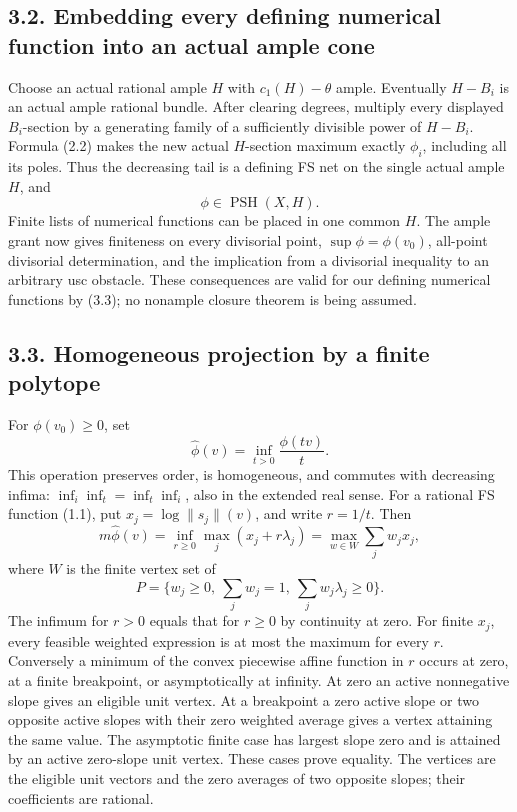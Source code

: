 \documentclass[
  10pt,
]{article}
\begin{document}
\subsection{3.2. Embedding every defining numerical function into an
actual ample
cone}\label{embedding-every-defining-numerical-function-into-an-actual-ample-cone}

Choose an actual rational ample \(H\) with \(c_1(H)-\theta\) ample.
Eventually \(H-B_i\) is an actual ample rational bundle. After clearing
degrees, multiply every displayed \(B_i\)-section by a generating family
of a sufficiently divisible power of \(H-B_i\). Formula (2.2) makes the
new actual \(H\)-section maximum exactly \(\phi_i\), including all its
poles. Thus the decreasing tail is a defining FS net on the single
actual ample \(H\), and \[\phi\in\operatorname{PSH}(X,H).\tag{3.3}\]
Finite lists of numerical functions can be placed in one common \(H\).
The ample grant now gives finiteness on every divisorial point,
\(\sup\phi=\phi(v_0)\), all-point divisorial determination, and the
implication from a divisorial inequality to an arbitrary usc obstacle.
These consequences are valid for our defining numerical functions by
(3.3); no nonample closure theorem is being assumed.

\subsection{3.3. Homogeneous projection by a finite
polytope}\label{homogeneous-projection-by-a-finite-polytope}

For \(\phi(v_0)\geq0\), set
\[\widehat\phi(v)=\inf_{t>0}\frac{\phi(tv)}t.\tag{3.4}\] This operation
preserves order, is homogeneous, and commutes with decreasing infima:
\(\inf_i\inf_t=\inf_t\inf_i\), also in the extended real sense. For a
rational FS function (1.1), put \(x_j=\log\|s_j\|(v)\), and write
\(r=1/t\). Then \[m\widehat\phi(v)=\inf_{r\geq0}\max_j(x_j+r\lambda_j)
=\max_{w\in W}\sum_jw_jx_j,\tag{3.5}\] where \(W\) is the finite vertex
set of
\[P=\{w_j\geq0,\ \sum_jw_j=1,\ \sum_jw_j\lambda_j\geq0\}.\tag{3.6}\] The
infimum for \(r>0\) equals that for \(r\geq0\) by continuity at zero.
For finite \(x_j\), every feasible weighted expression is at most the
maximum for every \(r\). Conversely a minimum of the convex piecewise
affine function in \(r\) occurs at zero, at a finite breakpoint, or
asymptotically at infinity. At zero an active nonnegative slope gives an
eligible unit vertex. At a breakpoint a zero active slope or two
opposite active slopes with their zero weighted average gives a vertex
attaining the same value. The asymptotic finite case has largest slope
zero and is attained by an active zero-slope unit vertex. These cases
prove equality. The vertices are the eligible unit vectors and the zero
averages of two opposite slopes; their coefficients are rational.
\end{document}
